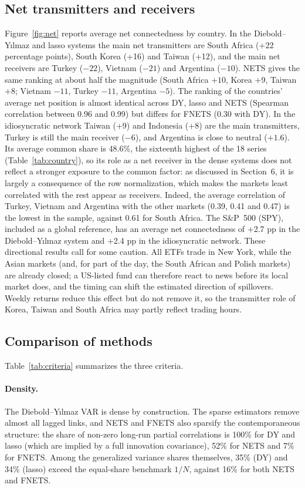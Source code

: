 \subsection{Net transmitters and receivers}
Figure~\ref{fig:net} reports average net connectedness by country. In the Diebold--Y{\i}lmaz and lasso systems the main net transmitters are South Africa (+22 percentage points), South Korea (+16) and Taiwan (+12), and the main net receivers are Turkey ($-22$), Vietnam ($-21$) and Argentina ($-10$). NETS gives the same ranking at about half the magnitude (South Africa $+10$, Korea $+9$, Taiwan $+8$; Vietnam $-11$, Turkey $-11$, Argentina $-5$). The ranking of the countries' average net position is almost identical across DY, lasso and NETS (Spearman correlation between 0.96 and 0.99) but differs for FNETS (0.30 with DY). In the idiosyncratic network Taiwan (+9) and Indonesia (+8) are the main transmitters, Turkey is still the main receiver ($-6$), and Argentina is close to neutral ($+1.6$). Its average common share is 48.6\%, the sixteenth highest of the 18 series (Table~\ref{tab:country}), so its role as a net receiver in the dense systems does not reflect a stronger exposure to the common factor: as discussed in Section~6, it is largely a consequence of the row normalization, which makes the markets least correlated with the rest appear as receivers. Indeed, the average correlation of Turkey, Vietnam and Argentina with the other markets (0.39, 0.41 and 0.47) is the lowest in the sample, against 0.61 for South Africa. The S\&P~500 (SPY), included as a global reference, has an average net connectedness of +2.7 pp in the Diebold--Y{\i}lmaz system and +2.4 pp in the idiosyncratic network. These directional results call for some caution. All ETFs trade in New York, while the Asian markets (and, for part of the day, the South African and Polish markets) are already closed; a US-listed fund can therefore react to news before its local market does, and the timing can shift the estimated direction of spillovers. Weekly returns reduce this effect but do not remove it, so the transmitter role of Korea, Taiwan and South Africa may partly reflect trading hours.

\subsection{Comparison of methods}
Table~\ref{tab:criteria} summarizes the three criteria.

\paragraph{Density.} The Diebold--Y{\i}lmaz VAR is dense by construction. The sparse estimators remove almost all lagged links, and NETS and FNETS also sparsify the contemporaneous structure: the share of non-zero long-run partial correlations is 100\% for DY and lasso (which are implied by a full innovation covariance), 52\% for NETS and 7\% for FNETS. Among the generalized variance shares themselves, 35\% (DY) and 34\% (lasso) exceed the equal-share benchmark $1/N$, against 16\% for both NETS and FNETS.

